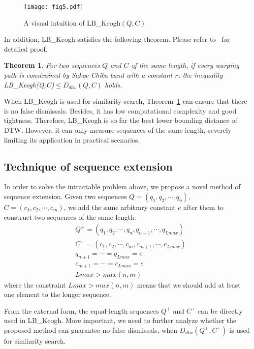 \documentclass[10pt,journal,compsoc]{IEEEtran}
\newtheorem{theorem}{Theorem}
\begin{document}
\begin{figure}[htbp]
  \centering
  \texttt{[image: fig5.pdf]}
  \caption{A visual intuition of LB\_Keogh$(Q,C)$}
  \label{fig:the lower bounding distance}
\end{figure}

In addition, LB\_Keogh satisfies the following theorem. Please refer to~\cite{keogh2005exact} for detailed proof.
\begin{theorem}\label{theorem:4}
For two sequences $Q$ and $C$ of the same length,
if every warping path is constrained by Sakoe-Chiba band with a constant $r$,
the inequality LB\_Keogh(Q,C)$\leq D_{dtw}(Q,C)$ holds.
\end{theorem}


When LB\_Keogh is used for similarity search, Theorem~\ref{theorem:4} can ensure that there is no false dismissals.
Besides, it has low computational complexity and good tightness.
Therefore, LB\_Keogh is so far the best lower bounding distance of DTW.
However, it can only measure sequences of the same length,
severely limiting its application in practical scenarios.


\subsection{Technique of sequence extension}

In order to solve the intractable problem above,
we propose a novel method of sequence extension.
Given two sequences $Q=(q_1, q_2, \cdots, q_n)$, $C=(c_1, c_2, \cdots, c_m)$,
we add the same arbitrary constant $e$ after them to construct two sequences of the same length:
\begin{equation}\label{eq:sequence extension}
\begin{split}
    & Q^+=(q_1, q_2, \cdots, q_n, q_{n+1},\cdots,q_{Lmax}) \\
    & C^+=(c_1, c_2, \cdots, c_m, c_{m+1}, \cdots,c_{Lmax}) \\
    & q_{n+1}=\cdots=q_{Lmax}=e \\
    & c_{m+1}=\cdots=c_{Lmax}=e \\
    & Lmax>max(n,m)
\end{split}
\end{equation}
where the constraint $Lmax>max(n,m)$ means that we should add at least one element to the longer sequence.

From the external form,
the equal-length sequences $Q^+$ and $C^+$ can be directly used in LB\_Keogh.
More important,
we need to further analyze whether the proposed method can guarantee no false dismissals,
when $D_{dtw}(Q^+,C^+)$ is used for similarity search.
\end{document}
